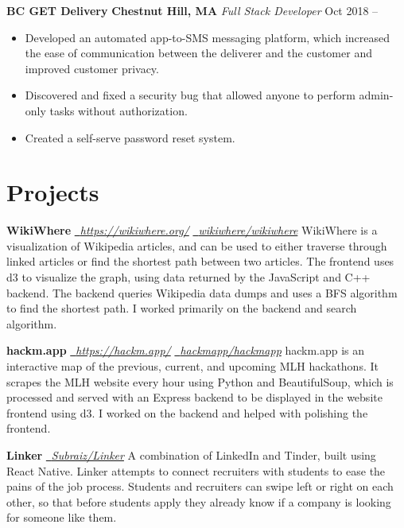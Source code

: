 \documentclass[10pt]{article}
\renewcommand{\date}[2]{#1 #2}
\newcommand{\daterange}[2]{#1 -- \ifthenelse{\equal{#2}{}}{\textit{Present}}{#2}}
\newcommand{\resumesection}[1]{\vspace{-0.2cm}\section*{#1}\vspace{-0.2cm}\vspace{0.1cm}}
\begin{document}
\begin{minipage}[t]{0.7\textwidth}
\begin{flushleft}
  \vspace{0.25cm}

  \textbf{BC GET Delivery}\quad\textit{\color{gray}{Student Run Startup}} \hfill \textbf{Chestnut Hill, MA} \newline
  \textit{Full Stack Developer} \hfill \daterange{\date{Oct}{2018}}{\date{Feb}{2019}}
  \begin{itemize}
    \item Developed an automated app-to-SMS messaging platform, which increased the ease of communication between the deliverer and the customer and improved customer privacy.
    \item Discovered and fixed a security bug that allowed anyone to perform admin-only tasks without authorization.
    \item Created a self-serve password reset system.
  \end{itemize}

  \resumesection{Projects}

  \textbf{WikiWhere} \hfill \href{https://wikiwhere.org/}{\faLink \, \textit{https://wikiwhere.org/}} \quad \href{https://github.com/wikiwhere/wikiwhere}{\faGithub \, \textit{wikiwhere/wikiwhere}} \newline
  WikiWhere is a visualization of Wikipedia articles, and can be used to either traverse through linked articles or find the shortest path between two articles. The frontend uses d3 to visualize the graph, using data returned by the JavaScript and C++ backend. The backend queries Wikipedia data dumps and uses a BFS algorithm to find the shortest path. I worked primarily on the backend and search algorithm.

  \vspace{0.25cm}

  \textbf{hackm.app} \hfill \href{https://hackm.app/}{\faLink \, \textit{https://hackm.app/}} \quad \href{https://github.com/hackmapp/hackmapp}{\faGithub \, \textit{hackmapp/hackmapp}} \newline
  hackm.app is an interactive map of the previous, current, and upcoming MLH hackathons. It scrapes the MLH website every hour using Python and BeautifulSoup, which is processed and served with an Express backend to be displayed in the website frontend using d3. I worked on the backend and helped with polishing the frontend.

  \vspace{0.25cm}

  \textbf{Linker} \hfill \href{https://github.com/Subraiz/Linker}{\faGithub \, \textit{Subraiz/Linker}} \newline
  A combination of LinkedIn and Tinder, built using React Native. Linker attempts to connect recruiters with students to ease the pains of the job process. Students and recruiters can swipe left or right on each other, so that before students apply they already know if a company is looking for someone like them.


  \end{flushleft}
\end{minipage}
\end{document}
